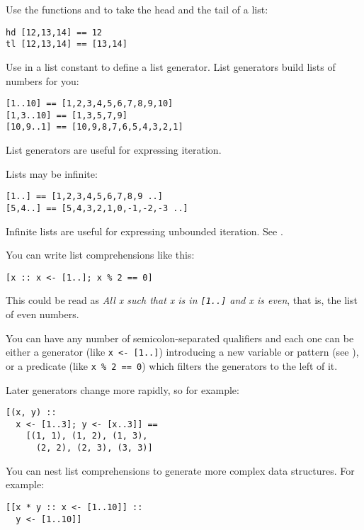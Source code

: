 Use the functions  and  to take the head and the
tail of a list:

\begin{verbatim}
hd [12,13,14] == 12
tl [12,13,14] == [13,14]
\end{verbatim}

Use  in a list constant to define a list generator. List generators
build lists of numbers for you:

\begin{verbatim}
[1..10] == [1,2,3,4,5,6,7,8,9,10]
[1,3..10] == [1,3,5,7,9]
[10,9..1] == [10,9,8,7,6,5,4,3,2,1]
\end{verbatim}

\noindent
List generators are useful for expressing iteration. 

Lists may be infinite:

\begin{verbatim}
[1..] == [1,2,3,4,5,6,7,8,9 ..]
[5,4..] == [5,4,3,2,1,0,-1,-2,-3 ..]
\end{verbatim}

\noindent
Infinite lists are useful for expressing unbounded iteration.
See .

You can write list comprehensions like this:

\begin{verbatim}
[x :: x <- [1..]; x % 2 == 0]
\end{verbatim}

\noindent
This could be read as {\em All x such that x is in \verb+[1..]+ and x is
even}, that is, the list of even numbers.

You can have any number of semicolon-separated qualifiers and each one can
be either a generator (like \verb"x <- [1..]") introducing a new variable
or pattern (see ), or a predicate (like \verb"x % 2 == 0") 
which filters the generators to the left of it.

Later generators change more rapidly, so for example:

\begin{verbatim}
[(x, y) :: 
  x <- [1..3]; y <- [x..3]] ==
    [(1, 1), (1, 2), (1, 3), 
      (2, 2), (2, 3), (3, 3)]
\end{verbatim}

You can nest list comprehensions to generate more complex data structures. For
example:

\begin{verbatim}
[[x * y :: x <- [1..10]] :: 
  y <- [1..10]]
\end{verbatim}

